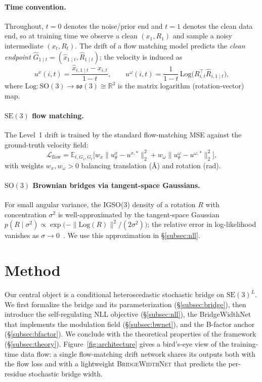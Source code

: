 \documentclass{article}
\theoremstyle{remark}
\theoremstyle{definition}
\newcommand{\R}{\mathbb{R}}
\newcommand{\E}{\mathbb{E}}
\newcommand{\SO}{\mathrm{SO}}
\newcommand{\SE}{\mathrm{SE}}
\newcommand{\so}{\mathfrak{so}}
\newcommand{\Log}{\mathrm{Log}}
\begin{document}
\paragraph{Time convention.}
Throughout, $t=0$ denotes the noise/prior end and $t=1$ denotes the clean data
end, so at training time we observe a clean $(x_1, R_1)$ and sample a noisy
intermediate $(x_t, R_t)$. The drift of a flow matching model predicts the
\emph{clean endpoint} $\hat{G}_{1\mid t}=(\hat{x}_{1\mid t},\hat{R}_{1\mid t})$;
the velocity is induced as
\begin{equation}
u^x(i,t)=\frac{\hat{x}_{i,1\mid t}-x_{i,t}}{1-t},\qquad
u^\omega(i,t)=\frac{1}{1-t}\,\Log\!\big(R_{i,t}^\top\hat{R}_{i,1\mid t}\big),
\label{eq:velocity}
\end{equation}
where $\Log:\SO(3)\to\so(3)\cong\R^3$ is the matrix logarithm
(rotation-vector) map.

\paragraph{$\SE(3)$ flow matching.}
The Level~1 drift is trained by the standard flow-matching MSE against the
ground-truth velocity field:
\begin{equation}
\mathcal{L}_{\text{flow}}=\E_{t,G_1,G_t}\!\Bigg[
  w_x\big\|u^x_\theta-u^{x,\ast}\big\|_2^2
  + w_\omega\big\|u^\omega_\theta-u^{\omega,\ast}\big\|_2^2
\Bigg],
\label{eq:flow-loss}
\end{equation}
with weights $w_x,w_\omega>0$ balancing translation (\AA) and rotation (rad).

\paragraph{$\SO(3)$ Brownian bridges via tangent-space Gaussians.}
For small angular variance, the IGSO(3) density of a rotation $R$ with
concentration $\sigma^2$ is well-approximated by the tangent-space Gaussian
$p(R\mid\sigma^2)\propto\exp\!\big(-\|\Log(R)\|^2/(2\sigma^2)\big)$; the
relative error in log-likelihood vanishes as $\sigma\to
0$~\citep{nikolayev1997igso3,leach2022denoisingso3}. We use this approximation
in \S\ref{subsec:nll}.

\section{Method}
\label{sec:method}

Our central object is a conditional heteroscedastic stochastic bridge on
$\SE(3)^L$. We first formalize the bridge and its parameterization
(\S\ref{subsec:bridge}), then introduce the self-regulating NLL objective
(\S\ref{subsec:nll}), the BridgeWidthNet that implements the modulation field
(\S\ref{subsec:bwnet}), and the B-factor anchor (\S\ref{subsec:bfactor}). We
conclude with the theoretical properties of the framework
(\S\ref{subsec:theory}). Figure~\ref{fig:architecture} gives a bird's-eye view
of the training-time data flow: a single flow-matching drift network shares
its outputs both with the flow loss and with a lightweight
\textsc{BridgeWidthNet} that predicts the per-residue stochastic bridge width.
\end{document}
